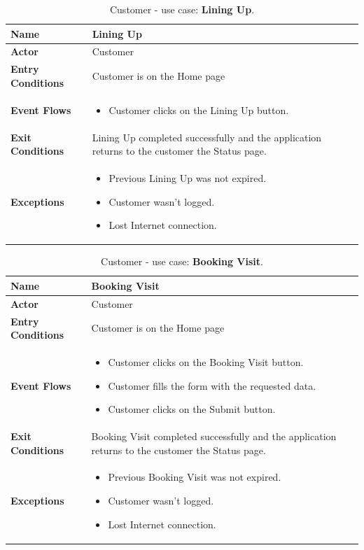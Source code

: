 \begin{table}[h!]
\centering
\begin{tabular}{| m{} | m{} |} 
	\hline
	\textbf{Name} & Lining Up \\ 
	\hline
	\textbf{Actor} & Customer \\ 
	\hline
	\textbf{Entry Conditions} & Customer is on the Home page \\ 
	\hline
	\textbf{Event Flows} &
	\begin{itemize}
	\item Customer clicks on the Lining Up button.
	\end{itemize} \\ 
	\hline
	\textbf{Exit Conditions} & Lining Up completed successfully and the application returns to the customer the Status page. \\ 
	\hline
	\textbf{Exceptions} &
	\begin{itemize}
	\item Previous Lining Up was not expired.
	\item Customer wasn't logged.
	\item Lost Internet connection.
	\end{itemize} \\ 
	\hline
\end{tabular}
\caption{Customer - use case: \textbf{Lining Up}.}
\label{tableLogIn}
\end{table}

\begin{table}[h!]
\centering
\begin{tabular}{| m{} | m{} |} 
	\hline
	\textbf{Name} & Booking Visit \\ 
	\hline
	\textbf{Actor} & Customer \\ 
	\hline
	\textbf{Entry Conditions} & Customer is on the Home page \\ 
	\hline
	\textbf{Event Flows} &
	\begin{itemize}
	\item Customer clicks on the Booking Visit button.
	\item Customer fills the form with the requested data.
	\item Customer clicks on the Submit button.
	\end{itemize} \\ 
	\hline
	\textbf{Exit Conditions} & Booking Visit completed successfully and the application returns to the customer the Status page. \\ 
	\hline
	\textbf{Exceptions} &
	\begin{itemize}
	\item Previous Booking Visit was not expired.
	\item Customer wasn't logged.
	\item Lost Internet connection.
	\end{itemize} \\ 
	\hline
\end{tabular}
\caption{Customer - use case: \textbf{Booking Visit}.}
\label{tableLogIn}
\end{table}

